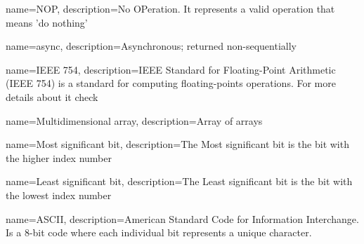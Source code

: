  {
	name=NOP,
	description={No OPeration. It represents a valid operation that means 'do nothing'}
}

 {
	name=async,
	description={Asynchronous; returned non-sequentially}
}

 {
	name=IEEE 754,
	description={IEEE Standard for Floating-Point Arithmetic (IEEE 754) is a standard for computing floating-points operations. For more details about it check \cite{IEEE-754}}
}

 {
	name=Multidimensional array,
	description={Array of arrays}
}

 {
	name=Most significant bit,
	description={The Most significant bit is the bit with the higher index number}
}

 {
	name=Least significant bit,
	description={The Least significant bit is the bit with the lowest index number}
}

 {
	name=ASCII,
	description={American Standard Code for Information Interchange. Is a 8-bit code where each individual bit represents a unique character.\cite{ascii}}
}


